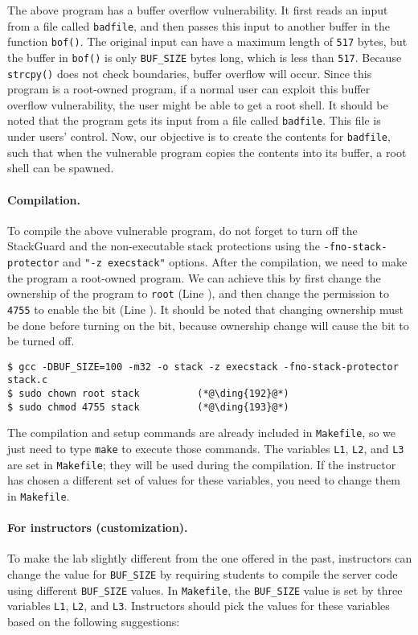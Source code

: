 The above program has a buffer overflow vulnerability. It first 
reads an input from a file called \texttt{badfile}, and then passes this
input to another buffer in the function {\tt bof()}. The 
original input can have a maximum length of \texttt{517} bytes, but the buffer
in {\tt bof()} is only \texttt{BUF\_SIZE} bytes long, which is less than
\texttt{517}. 
Because {\tt strcpy()} does not check
boundaries, buffer overflow will occur.
Since this program is a root-owned \setuid program, if a normal user can exploit
this buffer overflow vulnerability, the user might be 
able to get a root shell.
It should be noted that 
the program gets its input from a file called \texttt{badfile}. This file
is under users' control. Now, our objective is to 
create the contents for \texttt{badfile}, such that when the vulnerable program
copies the contents into its buffer, a root shell can be spawned.


\paragraph{Compilation.}
To compile the above vulnerable program, do not forget to 
turn off the StackGuard and the non-executable stack protections 
using the \texttt{-fno-stack-protector} and \texttt{"-z execstack"} options.
After the compilation, we need to make the program a
root-owned \setuid program. We can achieve this by first change the ownership of the program to
\texttt{root} (Line ), and then change the permission to \texttt{4755} to enable the
\setuid bit (Line ). It should be noted that changing ownership must be done before
turning on the \setuid bit, because ownership change will cause the \setuid bit to be turned
off.


\begin{lstlisting}
$ gcc -DBUF_SIZE=100 -m32 -o stack -z execstack -fno-stack-protector stack.c
$ sudo chown root stack          (*@\ding{192}@*)
$ sudo chmod 4755 stack          (*@\ding{193}@*)
\end{lstlisting}

The compilation and setup commands are already included in \texttt{Makefile}, 
so we just need to type \texttt{make} to execute those commands. 
The variables \texttt{L1}, \texttt{L2}, and \texttt{L3} are 
set in \texttt{Makefile}; they will be used during the compilation. 
If the instructor has chosen a different set of values 
for these variables, you need to change them in \texttt{Makefile}.


\paragraph{For instructors (customization).}
To make the lab slightly different from the one offered in the past,
instructors can change the value for \texttt{BUF\_SIZE} by requiring 
students to compile the server code using different \texttt{BUF\_SIZE} values. 
In \texttt{Makefile}, the \texttt{BUF\_SIZE} value is set by
three variables \texttt{L1}, \texttt{L2}, and \texttt{L3}. 
Instructors should pick the values for these variables based 
on the following suggestions:

